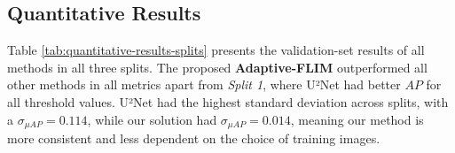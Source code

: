 \documentclass[times,twocolumn,final,authoryear]{elsarticle}
\begin{document}
    
    \begin{table}[htb]
 \centering
    \caption{Results of the proposed method with all components (FLIM), the same model but using only one ($FLIM_1$) and two ($FLIM_2$) layers, and the model without manual kernel selection ($FLIM*$).}
    \label{tab:ablation-studies}
\end{table}

    
\subsection{Quantitative Results}
    Table \ref{tab:quantitative-results-splits} presents the validation-set results of all methods in all three splits. The proposed \textbf{Adaptive-FLIM} outperformed all other methods in all metrics apart from \textit{Split 1}, where U²Net had better $AP$ for all threshold values. U²Net had the highest standard deviation across splits, with a $\sigma_{\mu AP} = 0.114$, while our solution had $\sigma_{\mu AP} = 0.014$, meaning our method is more consistent and less dependent on the choice of training images.
    
\end{document}
